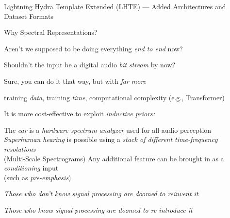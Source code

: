 \begin{slide}[\slideopts,toc={LHTE}]{Lightning Hydra Template Extended (LHTE) --- Added Architectures and Dataset Formats}
\end{slide}

\begin{slide}[\slideopts,toc={Spectra}]{Why Spectral Representations?}

  Aren't we supposed to be doing everything \emph{end to end} now?

  Shouldn't the input be a digital audio \emph{bit stream} by now?

  \begin{itemize}

    \mpitem Sure, you can do it that way, but with \emph{far more}
    \begin{itemize}
      \mpitem training \emph{data},
      \mpitem training \emph{time}, 
      \mpitem computational complexity (e.g., Transformer)
    \end{itemize}
    \mpitem It is more cost-effective to exploit \emph{inductive priors:}
    \begin{itemize}
      \mpitem The \emph{ear} is a \emph{hardware spectrum analyzer} used for all audio perception
      \mpitem \emph{Superhuman hearing} is possible using a \emph{stack of different time-frequency resolutions}\\
      (Multi-Scale Spectrograms)
      \mpitem Any additional feature can be brought in as a \emph{conditioning} input\\
      (such as \emph{pre-emphasis})
    \end{itemize}

  \end{itemize}

  \vspace{-1em}
\maybepause
    \centerline{\textit{Those who don't know signal processing are doomed to reinvent it}}
\maybepause
    \centerline{\textit{Those who know signal processing are doomed to re-introduce it}}

\end{slide}


